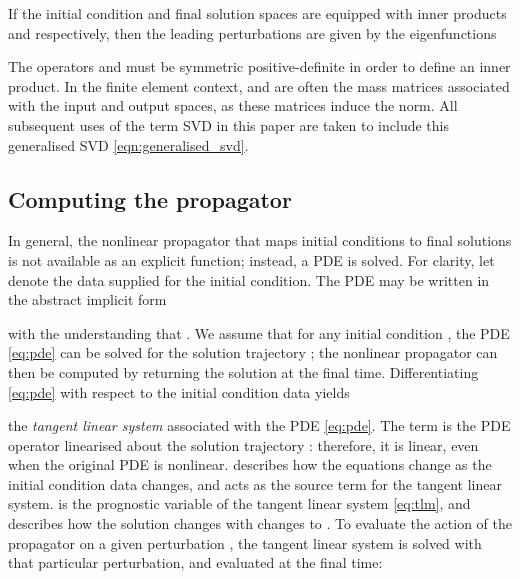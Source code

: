\documentclass{siamltex}
\begin{document}
If the initial condition and final solution spaces are equipped with inner products  and
 respectively, then the leading perturbations are given by the eigenfunctions

The operators  and  must be symmetric positive-definite in order to define an inner
product. In the finite element context,  and  are often the mass matrices associated with
the input and output spaces, as these matrices induce the  norm. All subsequent uses
of the term SVD in this paper are taken to include this generalised SVD \eqref{eqn:generalised_svd}.

\subsection{Computing the propagator}
In general, the nonlinear propagator  that maps initial conditions to final solutions is not available as an explicit function;
instead, a PDE is solved. For clarity, let  denote the data supplied for the initial condition. The PDE may be written in the abstract implicit
form

with the understanding that . We assume that for any initial condition , the PDE \eqref{eq:pde} can be solved for the solution trajectory ;
the nonlinear propagator  can then be computed by returning the solution at the final time. Differentiating \eqref{eq:pde} with respect to the
initial condition data  yields

the \emph{tangent linear system} associated with the PDE
\eqref{eq:pde}.  The term  is the PDE
operator linearised about the solution trajectory : therefore, it
is linear, even when the original PDE is nonlinear.  describes how the equations change as the initial
condition data  changes, and acts as the source term for the
tangent linear system.  is the prognostic
variable of the tangent linear system \eqref{eq:tlm}, and describes
how the solution changes with changes to . To evaluate the action
of the propagator  on a given perturbation , the tangent
linear system is solved with that particular perturbation, and
evaluated at the final time:
\end{document}
